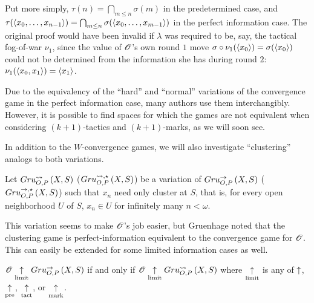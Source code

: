 Put more simply, $\tau(n)=\bigcap_{m\leq n}\sigma(m)$ in the predetermined
case, and
$\tau(\langle x_0,\dots,x_{n-1}\rangle)=\bigcap_{m\leq n}\sigma(\langle x_0,\dots,x_{m-1}\rangle)$
in the perfect information case.
The original proof would have been invalid if $\lambda$ was required to be, say,
the tactical fog-of-war $\nu_1$, since the value of $\mathscr{O}$'s own round $1$ move
$\sigma\circ\nu_1(\langle x_0\rangle)=\sigma(\langle x_0\rangle)$
could not be determined from the information she has during round
$2$: $\nu_1(\langle x_0,x_1\rangle)=\langle x_1\rangle$.

Due to the equivalency of the ``hard'' and ``normal'' variations of the
convergence game in the perfect information case, many authors use them
interchangibly. However, it is possible to find spaces for which the games are
not equivalent when considering $(k+1)$-tactics and $(k+1)$-marks, as we will
soon see.

In addition to the $W$-convergence games, we will also investigate
``clustering'' analogs to both variations.

\begin{game}
  Let $Gru_{O,P}^{\leadsto}\left({X},{S}\right)$ ($Gru_{O,P}^{\leadsto,\star}\left({X},{S}\right)$) be a variation of
  $Gru_{O,P}^{\to}\left({X},{S}\right)$ ($Gru_{O,P}^{\to,\star}\left({X},{S}\right)$) such that $x_n$ need only
  cluster at $S$, that is, for every open neighborhood $U$ of $S$, $x_n\in U$
  for infinitely many $n<\omega$.
\end{game}

This variation seems to make $\mathscr{O}$'s job easier, but Gruenhage noted that
the clustering game is perfect-information equivalent to the convergence game
for $\mathscr{O}$. This can easily be extended for some limited information cases
as well.

\begin{prop}
  $\mathscr{O} \underset{\text{limit}}{\uparrow} Gru_{O,P}^{\to}\left({X},{S}\right)$
    if and only if
  $\mathscr{O} \underset{\text{limit}}{\uparrow} Gru_{O,P}^{\leadsto}\left({X},{S}\right)$
  where $\underset{\text{limit}}{\uparrow}$ is any of $\uparrow$, $\underset{\text{pre}}{\uparrow}$, $\underset{\text{tact}}{\uparrow}$, or $\underset{\text{mark}}{\uparrow}$.
\end{prop}

